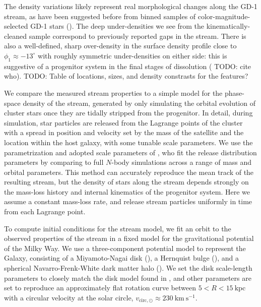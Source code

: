 \documentclass[modern]{aastex62}
\newcommand{\kpc}{\textrm{kpc}}
\newcommand{\kms}{\ensuremath{\textrm{km}~\textrm{s}^{-1}}}
\newcommand{\todo}[1]{{\color{red} TODO: #1}}
\begin{document}
The density variations likely represent real morphological changes along the
GD-1 stream, as have been suggested before from binned samples of
color-magnitude-selected GD-1 stars (\citealt{Carlberg:2013, DeBoer:2018}).
The deep under-densities we see from the kinematically-cleaned sample correspond
to previously reported gaps in the stream.
There is also a well-defined, sharp over-density in the surface density profile
close to $\phi_1 \approx -13^\circ$ with roughly symmetric under-densities on
either side:
this is suggestive of a progenitor system in the final stages of dissolution
(\todo{cite who}).
\todo{Table of locations, sizes, and density constrasts for the features?}

We compare the measured stream properties to a simple model for the phase-space
density of the stream, generated by only simulating the orbital evolution of
cluster stars once they are tidally stripped from the progenitor.
In detail, during simulation, star particles are released from the Lagrange
points of the cluster with a spread in position and velocity set by the mass of
the satellite and the location within the host galaxy, with some tunable scale
parameters.
We use the parametrization and adopted scale parameters of \citet{Fardal:2015},
who fit the release distribution parameters by comparing to full $N$-body
simulations across a range of mass and orbital parameters.
This method can accurately reproduce the mean track of the resulting stream, but
the density of stars along the stream depends strongly on the mass-loss history
and internal kinematics of the progenitor system.
Here we assume a constant mass-loss rate, and release stream particles uniformly
in time from each Lagrange point.

To compute initial conditions for the stream model, we fit an orbit to the
observed properties of the stream in a fixed model for the gravitational
potential of the Milky Way.
We use a three-component potential model to represent the Galaxy, consisting of
a Miyamoto-Nagai disk (\citealt{Miyamoto:1975}), a Hernquist bulge
(\citealt{Hernquist:1990}), and a spherical Navarro-Frenk-White dark matter halo
(\citealt{Navarro:1996}).
We set the disk scale-length parameters to closely match the disk model found in
\citet{Bovy:2015}, and other parameters are set to reproduce an approximately
flat rotation curve between $5 < R < 15~\kpc$ with a circular velocity at the
solar circle, $v_{\textrm{circ}, \odot} \approx 230~\kms$.
\end{document}
